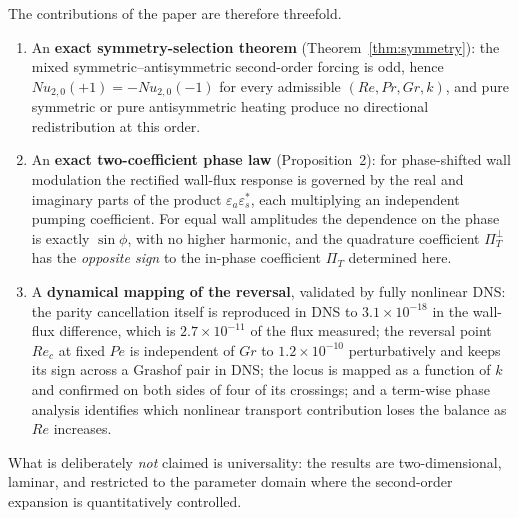 \documentclass[12pt,a4paper]{article}
\newcommand{\Rey}{\mathit{Re}}
\newcommand{\Pe}{\mathit{Pe}}
\newcommand{\Grr}{\mathit{Gr}}
\newcommand{\Nu}{\mathit{Nu}}
\renewcommand{\Pr}{\mathit{Pr}}
\newcommand{\PiT}{\Pi_T}
\begin{document}
The contributions of the paper are therefore threefold.
\begin{enumerate}
  \item An \textbf{exact symmetry-selection theorem} (Theorem~\ref{thm:symmetry}): the mixed
  symmetric--antisymmetric second-order forcing is odd, hence
  $\Nu_{2,0}(+1)=-\Nu_{2,0}(-1)$ for every admissible $(\Rey,\Pr,\Grr,k)$, and pure
  symmetric or pure antisymmetric heating produce no directional redistribution at
  this order.
  \item An \textbf{exact two-coefficient phase law} (Proposition~2): for
  phase-shifted wall modulation the rectified wall-flux response is governed by the
  real and imaginary parts of the product $\varepsilon_a\varepsilon_s^{*}$, each
  multiplying an independent pumping coefficient. For equal wall amplitudes the
  dependence on the phase is exactly $\sin\phi$, with no higher harmonic, and the
  quadrature coefficient $\PiT^{\perp}$ has the \emph{opposite sign} to the
  in-phase coefficient $\PiT$ determined here.
  \item A \textbf{dynamical mapping of the reversal}, validated by fully nonlinear
  DNS: the parity cancellation itself is reproduced in DNS to
  $3.1\times10^{-18}$ in the wall-flux difference, which is
  $2.7\times10^{-11}$ of the flux measured; the reversal point $\Rey_c$ at fixed
  $\Pe$ is independent of $\Grr$ to $1.2\times10^{-10}$ perturbatively and keeps
  its sign across a Grashof pair in DNS; the locus is mapped as a function of
  $k$ and confirmed on both sides of four of its crossings; and a term-wise
  phase analysis identifies which nonlinear
  transport contribution loses the balance as $\Rey$ increases.
\end{enumerate}
What is deliberately \emph{not} claimed is universality: the results are two-dimensional,
laminar, and restricted to the parameter domain where the second-order expansion is
quantitatively controlled.
\end{document}
